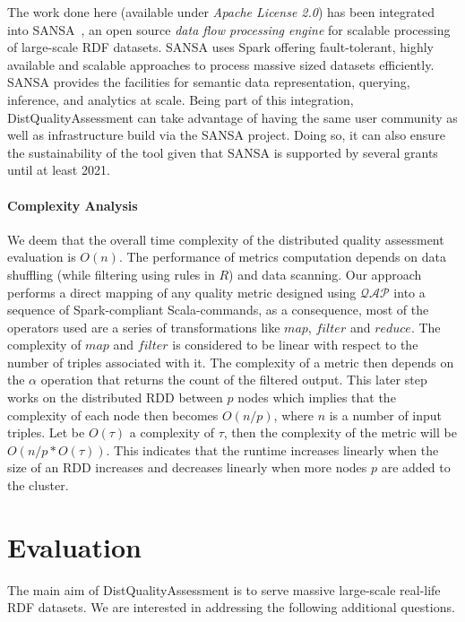 The work done here (available under \textit{Apache License 2.0}) has been integrated into SANSA~\cite{lehmann-2017-sansa-iswc}, an open source \emph{data flow processing engine} for scalable processing of large-scale \gls{RDF} datasets. 
SANSA uses Spark offering fault-tolerant, highly available and scalable approaches to process massive sized datasets efficiently. 
SANSA provides the facilities for semantic data representation, querying, inference, and analytics at scale.
Being part of this integration, DistQualityAssessment can take advantage of having the same user community as well as infrastructure build via the SANSA project.
Doing so, it can also ensure the sustainability of the tool given that SANSA is supported by several grants until at least 2021.

\paragraph{\textbf{Complexity Analysis}}
We deem that the overall time complexity of the distributed quality assessment evaluation is $O(n)$.
The performance of metrics computation depends on data shuffling (while filtering using rules in $R$) and data scanning. 
Our approach performs a direct mapping of any quality metric designed using $\mathcal{QAP}$ into a sequence of Spark-compliant Scala-commands, as a consequence, most of the operators used are a series of transformations like $map$, $filter$ and $reduce$.
The complexity of $map$ and $filter$ is considered to be linear with respect to the number of triples associated with it. 
The complexity of a metric then depends on the $\alpha$ operation that returns the count of the filtered output.
This later step works on the distributed \gls{RDD} between $p$ nodes which implies that the complexity of each node then becomes $O(n/p)$, where $n$ is a number of input triples.
Let be $O(\tau)$ a complexity of $\tau$, then the complexity of the metric will be $O(n/p*O(\tau))$.
This indicates that the runtime increases linearly when the size of an \gls{RDD} increases and decreases linearly when more nodes $p$ are added to the cluster.


\section{Evaluation}
\label{sec:distqualityassessment-evaluation}
The main aim of DistQualityAssessment is to serve massive large-scale real-life \gls{RDF} datasets. 
We are interested in addressing the following additional questions.

